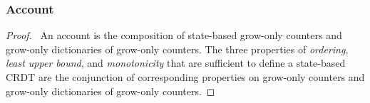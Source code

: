 \documentclass[9pt]{article}   	%
\begin{document}
\subsubsection{Account}
\label{sec:proof:account}

\begin{proof}
	\pfsketch ~An account is the composition of state-based grow-only counters and grow-only dictionaries of grow-only counters. The three properties of \textit{ordering}, \textit{least upper bound}, and \textit{monotonicity} that are sufficient to define a state-based CRDT are the conjunction of corresponding properties on grow-only counters and grow-only dictionaries of grow-only counters.
\end{proof}
\end{document}
